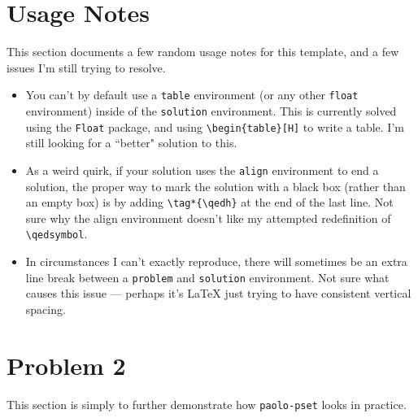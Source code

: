 \documentclass[11pt]{article}
\begin{document}
\section*{Usage Notes}
\begin{problem}
This section documents a few random usage notes for this template, and a few issues I'm still trying to resolve.

\begin{itemize}
	\item You can't by default use a \texttt{table} environment (or any other \texttt{float} environment) inside of the \texttt{solution} environment. This is currently solved using the \texttt{Float} package, and using \texttt{\textbackslash begin\{table\}[H]} to write a table. I'm still looking for a ``better" solution to this.
	\item As a weird quirk, if your solution uses the \texttt{align} environment to end a solution, the proper way to mark the solution with a black box (rather than an empty box) is by adding \texttt{\textbackslash tag*\{\textbackslash qedh\}} at the end of the last line. Not sure why the align environment doesn't like my attempted redefinition of \texttt{\textbackslash qedsymbol}. 
	\item In circumstances I can't exactly reproduce, there will sometimes be an extra line break between a \texttt{problem} and \texttt{solution} environment. Not sure what causes this issue --- perhaps it's {\LaTeX} just trying to have consistent vertical spacing.
\end{itemize}
\end{problem}

\newpage

\section*{Problem 2}
\begin{problem}
	This section is simply to further demonstrate how \texttt{paolo-pset} looks in practice.
\end{problem}	
\end{document}
